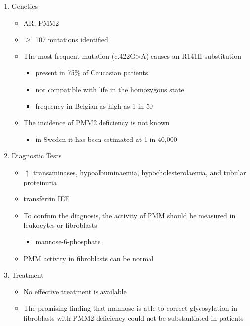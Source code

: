 \documentclass{scrartcl}
\begin{document}
\begin{enumerate}
\item Genetics
\label{sec:org80de9fb}
\begin{itemize}
\item AR, PMM2
\item \(\ge\) 107 mutations identified
\item The most frequent mutation (c.422G>A) causes an R141H substitution
\begin{itemize}
\item present in 75\% of Caucasian patients
\item not compatible with life in the homozygous state
\item frequency in Belgian as high as 1 in 50
\end{itemize}
\item The incidence of PMM2 deficiency is not known
\begin{itemize}
\item in Sweden it has been estimated at 1 in 40,000
\end{itemize}
\end{itemize}

\item Diagnostic Tests
\label{sec:org5d7f75f}
\begin{itemize}
\item \(\uparrow\) transaminases, hypoalbuminaemia, hypocholesterolaemia, and
tubular proteinuria
\item transferrin IEF
\item To confirm the diagnosis, the activity of PMM should be measured in
leukocytes or fibroblasts
\begin{itemize}
\item\relax [2-H\(^{\text{3}}\)]mannose-6-phosphate
\end{itemize}
\item PMM activity in fibroblasts can be normal
\end{itemize}

\item Treatment
\label{sec:orgc8f58c0}
\begin{itemize}
\item No effective treatment is available
\item The promising finding that mannose is able to correct glycosylation
in fibroblasts with PMM2 deficiency could not be substantiated in
patients
\end{itemize}
\end{enumerate}
\end{document}
